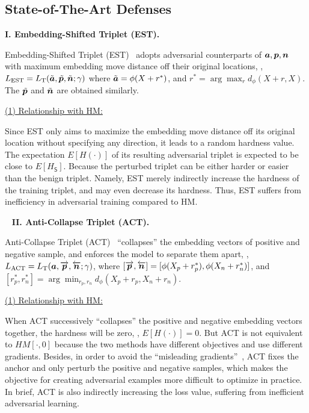 \subsection{State-of-The-Art Defenses}

\noindent\textbf{I. Embedding-Shifted Triplet (EST).}~\cite{advrank}

Embedding-Shifted Triplet (EST)~\cite{advrank} adopts adversarial counterparts
of ${\bm{a}},{\bm{p}},{\bm{n}}$ with maximum embedding move distance off their original
locations, \ie,
$L_\text{EST}=L_\text{T}(\tilde{{\bm{a}}},\tilde{{\bm{p}}},\tilde{{\bm{n}}};\gamma)$ where
$\tilde{{\bm{a}}}=\phi(X+r^*)$, and $r^*=\arg\max_{r}d_\phi(X+r, X)$.
%
The $\tilde{{\bm{p}}}$ and $\tilde{{\bm{n}}}$ are obtained similarly.

\ul{(1) Relationship with HM:}

Since EST only aims to maximize the embedding move distance off its original
location without specifying any direction, it leads to a random hardness value.
%
The expectation $E[H(\cdot)]$ of its resulting adversarial triplet is expected
to be close to $E[H_\mathsf{S}]$.
%
Because the perturbed triplet can be either harder or easier than the benign
triplet.
%
Namely, EST merely indirectly increase the hardness of the training triplet,
and may even decrease its hardness.
%
Thus, EST suffers from inefficiency in adversarial training compared to HM.

~\newline
\noindent\textbf{II. Anti-Collapse Triplet (ACT).}~\cite{robrank}

Anti-Collapse Triplet (ACT)~\cite{robrank} ``collapses'' the embedding vectors
of positive and negative sample, and enforces the model to separate them apart,
\ie, $L_\text{ACT}=L_\text{T}({\bm{a}}, \overrightarrow{{\bm{p}}},
\overleftarrow{{\bm{n}}};\gamma)$, where $[\overrightarrow{{\bm{p}}},\overleftarrow{{\bm{n}}}]
=[\phi(X_p+r_p^*), \phi(X_n+r_n^*)]$, and $[r_p^*,r_n^*]=\arg\min_{r_p,r_n}
d_\phi(X_p+r_p, X_n+r_n)$.

\ul{(1) Relationship with HM:}

When ACT successively ``collapses'' the positive and negative embedding
vectors together, the hardness will be zero, \ie, $E[H(\cdot)]=0$.
%
But ACT is not equivalent to $HM[\cdot,0]$ because the two methods have
different objectives and use different gradients.
%
Besides, in order to avoid the ``misleading gradients''~\cite{robrank}, ACT
fixes the anchor and only perturb the positive and negative samples, which
makes the objective for creating adversarial examples more difficult to
optimize in practice.
%
In brief, ACT is also indirectly increasing the loss value, suffering from
inefficient adversarial learning.

